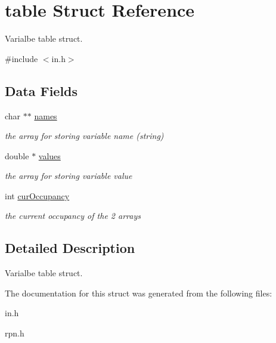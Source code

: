 \hypertarget{structtable}{\section{table Struct Reference}
\label{structtable}
}


Varialbe table struct.  




{\ttfamily \#include $<$in.\-h$>$}

\subsection*{Data Fields}
\begin{DoxyCompactItemize}
\item 
\hypertarget{structtable_aa268c08498aaf897c448242dac727076}{char $\ast$$\ast$ \hyperlink{structtable_aa268c08498aaf897c448242dac727076}{names}}\label{structtable_aa268c08498aaf897c448242dac727076}

\begin{DoxyCompactList}\small\item\em the array for storing variable name (string) \end{DoxyCompactList}\item 
\hypertarget{structtable_a398a3644f68885e8eb424d22270e7c31}{double $\ast$ \hyperlink{structtable_a398a3644f68885e8eb424d22270e7c31}{values}}\label{structtable_a398a3644f68885e8eb424d22270e7c31}

\begin{DoxyCompactList}\small\item\em the array for storing variable value \end{DoxyCompactList}\item 
\hypertarget{structtable_aef8007b712486b5acb83207b52671d1e}{int \hyperlink{structtable_aef8007b712486b5acb83207b52671d1e}{cur\-Occupancy}}\label{structtable_aef8007b712486b5acb83207b52671d1e}

\begin{DoxyCompactList}\small\item\em the current occupancy of the 2 arrays \end{DoxyCompactList}\end{DoxyCompactItemize}


\subsection{Detailed Description}
Varialbe table struct. 

The documentation for this struct was generated from the following files\-:\begin{DoxyCompactItemize}
\item 
in.\-h\item 
rpn.\-h\end{DoxyCompactItemize}
